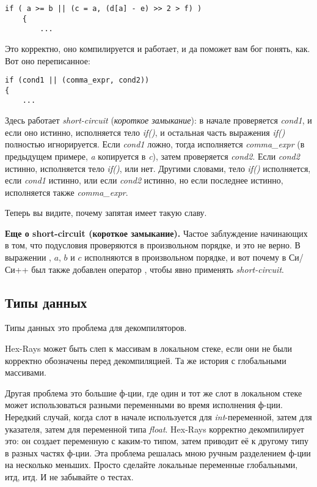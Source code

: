 \begin{lstlisting}[style=customc]
 if ( a >= b || (c = a, (d[a] - e) >> 2 > f) )
    {
    	...
\end{lstlisting}

Это корректно, оно компилируется и работает, и да поможет вам бог понять, как.
Вот оно переписанное:

\begin{lstlisting}[style=customc]
if (cond1 || (comma_expr, cond2))
{
	...
\end{lstlisting}

Здесь работает \emph{short-circuit} (\emph{короткое замыкание}): в начале проверяется \emph{cond1}, и если оно истинно,
исполняется тело \emph{if()}, и остальная часть выражения \emph{if()} полностью игнорируется.
Если \emph{cond1} ложно, тогда исполняется \emph{comma\_expr} (в предыдущем примере, \emph{a} копируется в \emph{c}),
затем проверяется \emph{cond2}.
Если \emph{cond2} истинно, исполняется тело \emph{if()}, или нет.
Другими словами, тело \emph{if()} исполняется, если \emph{cond1} истинно, или если \emph{cond2} истинно,
но если последнее истинно, исполняется также \emph{comma\_expr}.

Теперь вы видите, почему запятая имеет такую славу.

\textbf{Еще о short-circuit (короткое замыкание).}
Частое заблуждение начинающих в том, что подусловия проверяются в произвольном порядке, и это не верно.
В выражении , $a$, $b$ и $c$ исполняются в произвольном порядке, и вот почему в Си/Си++ был также добавлен
оператор \TT{||}, чтобы явно применять \emph{short-circuit}.

\subsection{Типы данных}

Типы данных это проблема для декомпиляторов.

Hex-Rays может быть слеп к массивам в локальном стеке, если они не были корректно обозначены перед декомпиляцией.
Та же история с глобальными массивами.

Другая проблема это большие ф-ции, где один и тот же слот в локальном стеке может использоваться разными переменными
во время исполнения ф-ции.
Нередкий случай, когда слот в начале используется для \emph{int}-переменной, затем для указателя, затем для переменной типа
\emph{float}.
Hex-Rays корректно декомпилирует это: он создает переменную с каким-то типом, затем приводит её к другому типу в разных частях
ф-ции.
Эта проблема решалась мною ручным разделением ф-ции на несколько меньших.
Просто сделайте локальные переменные глобальными, итд, итд.
И не забывайте о тестах.

